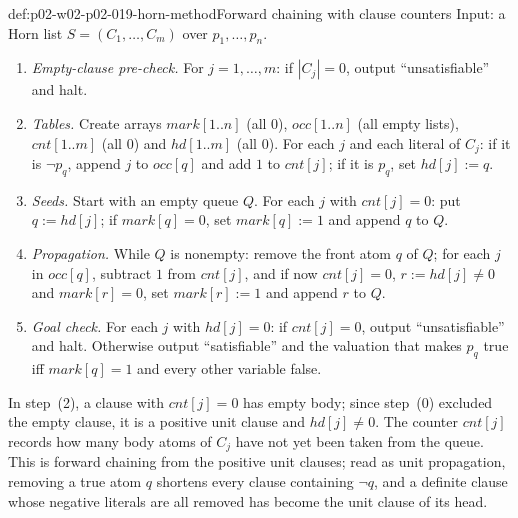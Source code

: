 \begin{hbmethod}{def:p02-w02-p02-019-horn-method}{Forward chaining with clause counters}
Input: a Horn list \(S=(C_1,\ldots,C_m)\) over \(p_1,\ldots,p_n\).
\begin{enumerate}
  \item[(0)] \emph{Empty-clause pre-check.}  For \(j=1,\ldots,m\): if
        \(|C_j|=0\), output ``unsatisfiable'' and halt.
  \item[(1)] \emph{Tables.}  Create arrays \(\mathit{mark}[1..n]\) (all
        \(0\)), \(\mathit{occ}[1..n]\) (all empty lists),
        \(\mathit{cnt}[1..m]\) (all \(0\)) and \(\mathit{hd}[1..m]\) (all
        \(0\)).  For each \(j\) and each literal of \(C_j\): if it is
        \(\neg p_q\), append \(j\) to \(\mathit{occ}[q]\) and add \(1\) to
        \(\mathit{cnt}[j]\); if it is \(p_q\), set \(\mathit{hd}[j]:=q\).
  \item[(2)] \emph{Seeds.}  Start with an empty queue \(Q\).  For each \(j\)
        with \(\mathit{cnt}[j]=0\): put \(q:=\mathit{hd}[j]\); if
        \(\mathit{mark}[q]=0\), set \(\mathit{mark}[q]:=1\) and append \(q\)
        to \(Q\).
  \item[(3)] \emph{Propagation.}  While \(Q\) is nonempty: remove the front
        atom \(q\) of \(Q\); for each \(j\) in \(\mathit{occ}[q]\), subtract
        \(1\) from \(\mathit{cnt}[j]\), and if now \(\mathit{cnt}[j]=0\),
        \(r:=\mathit{hd}[j]\neq 0\) and \(\mathit{mark}[r]=0\), set
        \(\mathit{mark}[r]:=1\) and append \(r\) to \(Q\).
  \item[(4)] \emph{Goal check.}  For each \(j\) with \(\mathit{hd}[j]=0\): if
        \(\mathit{cnt}[j]=0\), output ``unsatisfiable'' and halt.  Otherwise
        output ``satisfiable'' and the valuation that makes \(p_q\) true iff
        \(\mathit{mark}[q]=1\) and every other variable false.
\end{enumerate}
In step~(2), a clause with \(\mathit{cnt}[j]=0\) has empty body; since step~(0)
excluded the empty clause, it is a positive unit clause and
\(\mathit{hd}[j]\neq 0\).  The counter \(\mathit{cnt}[j]\) records how many
body atoms of \(C_j\) have not yet been taken from the queue.  This is forward
chaining from the positive unit clauses; read as unit propagation, removing a
true atom \(q\) shortens every clause containing \(\neg q\), and a definite
clause whose negative literals are all removed has become the unit clause of
its head.
\end{hbmethod}

